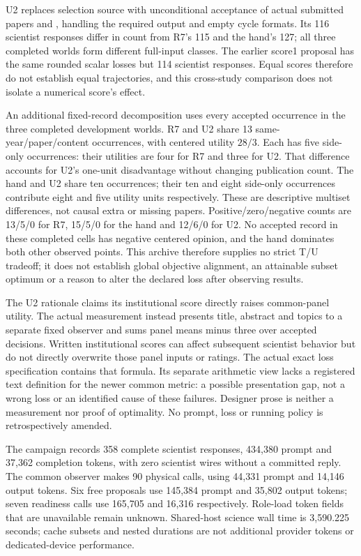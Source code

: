 U2 replaces selection source with unconditional acceptance of actual submitted
papers and , handling the required output and empty
cycle formats. Its 116 scientist responses differ in count from R7's 115 and
the hand's 127; all three completed worlds form different full-input classes.
The earlier score1 proposal has the same rounded scalar losses but 114
scientist responses. Equal scores therefore do not establish equal trajectories,
and this cross-study comparison does not isolate a numerical score's effect.

An additional fixed-record decomposition uses every accepted occurrence in the
three completed development worlds. R7 and U2 share 13 same-year/paper/content
occurrences, with centered utility $28/3$. Each has five side-only occurrences:
their utilities are four for R7 and three for U2. That difference accounts for
U2's one-unit disadvantage without changing publication count. The hand and U2
share ten occurrences; their ten and eight side-only occurrences contribute
eight and five utility units respectively. These are descriptive multiset
differences, not causal extra or missing papers. Positive/zero/negative counts
are 13/5/0 for R7, 15/5/0 for the hand and 12/6/0 for U2. No accepted record in
these completed cells has negative centered opinion, and the hand dominates
both other observed points. This archive therefore supplies no strict T/U
tradeoff; it does not establish global objective alignment, an attainable
subset optimum or a reason to alter the declared loss after observing results.

The U2 rationale claims its institutional score directly raises common-panel
utility. The actual measurement instead presents title, abstract and topics
to a separate fixed observer and sums panel means minus three over accepted
decisions. Written institutional scores can affect subsequent scientist
behavior but do not directly overwrite those panel inputs or ratings.
The actual exact loss specification contains that formula. Its separate
arithmetic view lacks a registered text definition for the newer common
metric: a possible presentation gap, not a wrong loss or an identified cause
of these failures. Designer prose is neither a measurement nor proof of
optimality. No prompt, loss or running policy is retrospectively amended.

The campaign records 358 complete scientist responses, 434,380 prompt and
37,362 completion tokens, with zero scientist wires without a committed reply.
The common observer makes 90 physical calls, using 44,331 prompt and 14,146
output tokens. Six free proposals use 145,384 prompt and 35,802 output tokens;
seven readiness calls use 165,705 and 16,316 respectively. Role-load token
fields that are unavailable remain unknown. Shared-host science wall time is
3,590.225 seconds; cache subsets and nested durations are not additional
provider tokens or dedicated-device performance.

